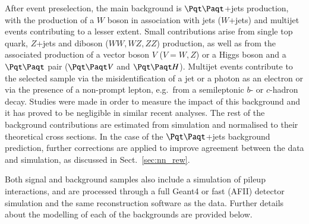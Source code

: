 After event preselection, the main background is $\ttbar$+jets production, with the production of a $W$ boson in association with
jets ($W$+jets) and multijet events contributing to a lesser extent. Small contributions arise from single top quark, $Z$+jets and 
diboson ($WW,WZ,ZZ$) production, as well as from the associated production of a vector boson $V$ ($V=W,Z$) or a Higgs boson 
and a $\ttbar$ pair ($\ttbar V$ and $\ttbar H$). Multijet events contribute to the selected sample via the misidentification of a jet or 
a photon as an electron or via the presence of a non-prompt lepton, e.g.~from a semileptonic $b$- or $c$-hadron decay. Studies were made in order to measure the impact of this background and it has proved to be negligible in similar recent analyses. The rest of the background contributions are estimated from simulation 
and normalised to their theoretical cross sections. In the case of the $\ttbar$+jets background prediction, further corrections are 
applied to improve agreement between the data and simulation, as discussed in Sect.~\ref{sec:nn_rew}.

Both signal and background samples also include a simulation of pileup interactions, and are processed through a 
full {\sc Geant4} or fast (AFII) detector simulation and the same reconstruction software as the data. Further details about the modelling of each 
of the backgrounds are provided below. 

